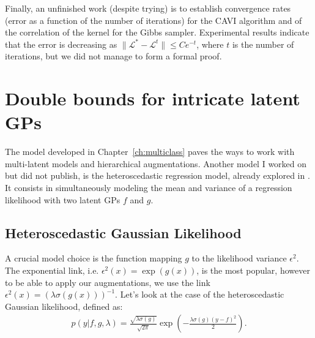 Finally, an unfinished work (despite trying) is to establish convergence rates (error as a function of the number of iterations) for the \ac{CAVI} algorithm and of the correlation of the kernel for the Gibbs sampler.
Experimental results indicate that the error is decreasing as $\|\mathcal{L}^{*} - \mathcal{L}^{t}\|\leq C e^{-t}$, where $t$ is the number of iterations, but we did not manage to form a formal proof.


\section{Double bounds for intricate latent GPs}
\label{sec:heteroscedastic}
The model developed in Chapter~\ref{ch:multiclass} paves the ways to work with multi-latent models and hierarchical augmentations.
Another model I worked on but did not publish, is the heteroscedastic regression model,  already explored in \cite{wangGaussianProcessRegression2012,lazaro-gredillaVariationalHeteroscedasticGaussian}.
It consists in simultaneously modeling the mean and variance of a regression likelihood with two latent \ac{GPs} $f$ and $g$.

\subsection{Heteroscedastic Gaussian Likelihood}

A crucial model choice is the function mapping $g$ to the likelihood variance $\epsilon^2$.
The exponential link, i.e. $\epsilon^2(x) = \exp(g(x))$, is the most popular, however to be able to apply our augmentations, we use the link $\epsilon^2(x) = \left(\lambda \sigma(g(x))\right)^{-1}$.
Let's look at the case of the heteroscedastic Gaussian likelihood, defined as:
\begin{align}
    p(y|f,g,\lambda) = \frac{\sqrt{\lambda \sigma(g)}}{\sqrt{2\pi}}\exp\left(-\frac{\lambda \sigma(g)(y-f)^2}{2}\right).\label{eq:hetero_lik}
\end{align}

